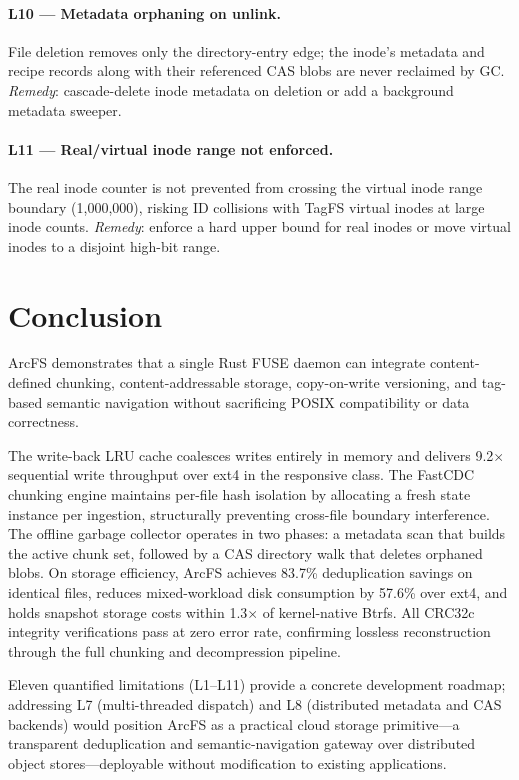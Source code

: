 \documentclass[5p,times]{elsarticle}
\begin{document}
\paragraph{L10 — Metadata orphaning on unlink.}
File deletion removes only the directory-entry edge; the inode's metadata
and recipe records along with their referenced CAS blobs are never
reclaimed by GC.  \textit{Remedy}: cascade-delete inode metadata on
deletion or add a background metadata sweeper.

\paragraph{L11 — Real/virtual inode range not enforced.}
The real inode counter is not prevented from crossing the virtual inode
range boundary (1,000,000), risking ID collisions with TagFS virtual
inodes at large inode counts.  \textit{Remedy}: enforce a hard upper
bound for real inodes or move virtual inodes to a disjoint high-bit range.

\section{Conclusion}

ArcFS demonstrates that a single Rust FUSE daemon can integrate
content-defined chunking, content-addressable storage, copy-on-write
versioning, and tag-based semantic navigation without sacrificing POSIX
compatibility or data correctness.

The write-back LRU cache coalesces writes entirely in memory and delivers
9.2$\times$ sequential write throughput over ext4 in the responsive class.
The FastCDC chunking engine maintains per-file hash isolation by allocating
a fresh state instance per ingestion, structurally preventing cross-file
boundary interference.
The offline garbage collector operates in two phases: a metadata scan
that builds the active chunk set, followed by a CAS directory walk that
deletes orphaned blobs.  On storage efficiency, ArcFS
achieves 83.7\% deduplication savings on identical files, reduces
mixed-workload disk consumption by 57.6\% over ext4, and holds snapshot
storage costs within 1.3$\times$ of kernel-native Btrfs. All CRC32c
integrity verifications pass at zero error rate, confirming lossless
reconstruction through the full chunking and decompression pipeline.

Eleven quantified limitations (L1--L11) provide a concrete development
roadmap; addressing L7 (multi-threaded dispatch) and
L8 (distributed metadata and CAS backends) would position ArcFS as a
practical cloud storage primitive---a transparent deduplication and
semantic-navigation gateway over distributed object stores---deployable
without modification to existing applications.
\end{document}
